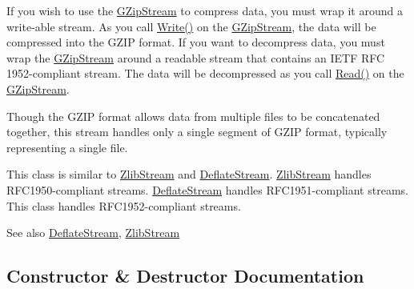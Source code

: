 If you wish to use the {\ttfamily \mbox{\hyperlink{class_super_tiled2_unity_1_1_ionic_1_1_zlib_1_1_g_zip_stream}{G\+Zip\+Stream}}} to compress data, you must wrap it around a write-\/able stream. As you call {\ttfamily \mbox{\hyperlink{class_super_tiled2_unity_1_1_ionic_1_1_zlib_1_1_g_zip_stream_a49032afb5806563236a5d53841abe2b8}{Write()}}} on the {\ttfamily \mbox{\hyperlink{class_super_tiled2_unity_1_1_ionic_1_1_zlib_1_1_g_zip_stream}{G\+Zip\+Stream}}}, the data will be compressed into the G\+Z\+IP format. If you want to decompress data, you must wrap the {\ttfamily \mbox{\hyperlink{class_super_tiled2_unity_1_1_ionic_1_1_zlib_1_1_g_zip_stream}{G\+Zip\+Stream}}} around a readable stream that contains an I\+E\+TF R\+FC 1952-\/compliant stream. The data will be decompressed as you call {\ttfamily \mbox{\hyperlink{class_super_tiled2_unity_1_1_ionic_1_1_zlib_1_1_g_zip_stream_a772b5013a585850ffaf8be4aa7f3dbcf}{Read()}}} on the {\ttfamily \mbox{\hyperlink{class_super_tiled2_unity_1_1_ionic_1_1_zlib_1_1_g_zip_stream}{G\+Zip\+Stream}}}. 

Though the G\+Z\+IP format allows data from multiple files to be concatenated together, this stream handles only a single segment of G\+Z\+IP format, typically representing a single file. 

This class is similar to \mbox{\hyperlink{class_super_tiled2_unity_1_1_ionic_1_1_zlib_1_1_zlib_stream}{Zlib\+Stream}} and \mbox{\hyperlink{class_super_tiled2_unity_1_1_ionic_1_1_zlib_1_1_deflate_stream}{Deflate\+Stream}}. {\ttfamily \mbox{\hyperlink{class_super_tiled2_unity_1_1_ionic_1_1_zlib_1_1_zlib_stream}{Zlib\+Stream}}} handles R\+F\+C1950-\/compliant streams. \mbox{\hyperlink{class_super_tiled2_unity_1_1_ionic_1_1_zlib_1_1_deflate_stream}{Deflate\+Stream}} handles R\+F\+C1951-\/compliant streams. This class handles R\+F\+C1952-\/compliant streams. 

\begin{DoxySeeAlso}{See also}
\mbox{\hyperlink{class_super_tiled2_unity_1_1_ionic_1_1_zlib_1_1_deflate_stream}{Deflate\+Stream}}, \mbox{\hyperlink{class_super_tiled2_unity_1_1_ionic_1_1_zlib_1_1_zlib_stream}{Zlib\+Stream}}


\end{DoxySeeAlso}


\subsection{Constructor \& Destructor Documentation}
\mbox{\label{class_super_tiled2_unity_1_1_ionic_1_1_zlib_1_1_g_zip_stream_a509b4683754c1e03e277c5688b75cf54}} 

